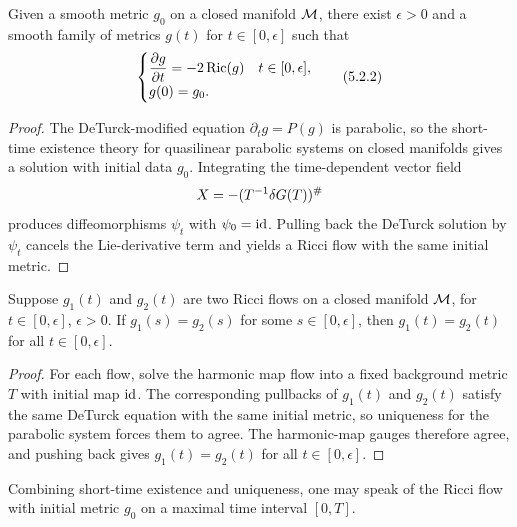 \begin{theorem}
\label{topping-ricci-flow-short-time-existence}
Given a smooth metric $g_0$ on a closed manifold $\mathcal{M}$, there exist $\epsilon>0$ and a smooth family of metrics $g(t)$ for $t\in[0,\epsilon]$ such that
\[
\begin{cases}
\dfrac{\partial g}{\partial t}=-2\operatorname{Ric}(g) & t\in[0,\epsilon],\\
g(0)=g_0.
\end{cases}
\tag{5.2.2}
\]
\end{theorem}

\begin{proof}
The DeTurck-modified equation $\partial_t g=P(g)$ is parabolic, so the short-time existence theory for quasilinear parabolic systems on closed manifolds gives a solution with initial data $g_0$. Integrating the time-dependent vector field
\[
X=-(T^{-1}\delta G(T))^\#
\]
produces diffeomorphisms $\psi_t$ with $\psi_0=\operatorname{id}$. Pulling back the DeTurck solution by $\psi_t$ cancels the Lie-derivative term and yields a Ricci flow with the same initial metric.
\end{proof}

\begin{theorem}
\label{topping-ricci-flow-uniqueness}
Suppose $g_1(t)$ and $g_2(t)$ are two Ricci flows on a closed manifold $\mathcal{M}$, for $t\in[0,\epsilon]$, $\epsilon>0$. If $g_1(s)=g_2(s)$ for some $s\in[0,\epsilon]$, then $g_1(t)=g_2(t)$ for all $t\in[0,\epsilon]$.
\end{theorem}

\begin{proof}
For each flow, solve the harmonic map flow into a fixed background metric $T$ with initial map $\operatorname{id}$. The corresponding pullbacks of $g_1(t)$ and $g_2(t)$ satisfy the same DeTurck equation with the same initial metric, so uniqueness for the parabolic system forces them to agree. The harmonic-map gauges therefore agree, and pushing back gives $g_1(t)=g_2(t)$ for all $t\in[0,\epsilon]$.
\end{proof}

Combining short-time existence and uniqueness, one may speak of the Ricci flow with initial metric $g_0$ on a maximal time interval $[0,T]$.

